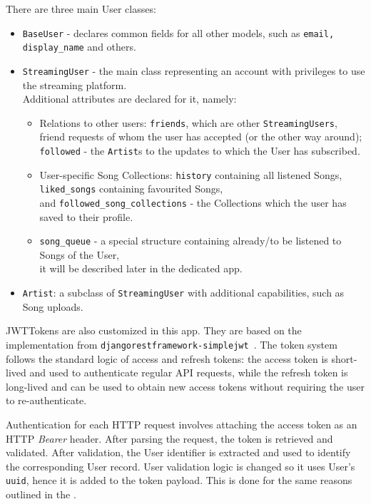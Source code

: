There are three main User classes:
\begin{itemize}
    \item \texttt{BaseUser} - declares common fields for all other models, such as \texttt{email, display\_name} and others.
    \item \texttt{StreamingUser} - the main class representing an account with privileges to use the streaming platform.\\
    Additional attributes are declared for it, namely:
    \begin{itemize}
        \item Relations to other users: \texttt{friends}, which are other \texttt{StreamingUsers},\\
        friend requests of whom the user has accepted (or the other way around);\\
        \texttt{followed} - the \texttt{Artist}s to the updates to which the User has subscribed.

        \item User-specific Song Collections: \texttt{history} containing all listened Songs,\\
        \texttt{liked\_songs} containing favourited Songs,\\
        and \texttt{followed\_song\_collections} - the Collections which the user has saved to their profile.

        \item \texttt{song\_queue} - a special structure containing already/to be listened to Songs of the User,\\
        it will be described later in the dedicated app.
    \end{itemize}
    \item \texttt{Artist}: a subclass of \texttt{StreamingUser} with additional capabilities, such as Song uploads.
\end{itemize}

JWTTokens are also customized in this app.
They are based on the implementation from \texttt{djangorestframework-simplejwt}~\cite{simplejwt}.
The token system follows the standard logic of access and refresh tokens:
the access token is short-lived and used to authenticate regular API requests,
while the refresh token is long-lived and can be used to obtain new access tokens without requiring
the user to re-authenticate.

Authentication for each HTTP request involves attaching the access token as an HTTP \textit{Bearer} header.
After parsing the request, the token is retrieved and validated.
After validation, the User identifier is extracted and used to identify the corresponding User record.
User validation logic is changed so it uses User's \texttt{uuid}, hence it is added to the token payload.
This is done for the same reasons outlined in the .

